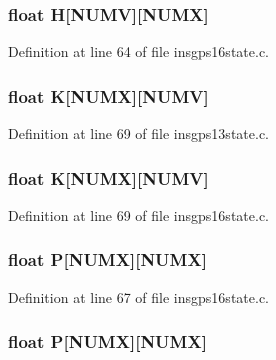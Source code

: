 \hypertarget{group___i_n_s_g_p_s_ga4080397a0d248e4c99d6f284b187f206}{
\subsubsection[{H}]{\setlength{\rightskip}{0pt plus 5cm}float H\mbox{[}N\-U\-M\-V\mbox{]}\mbox{[}N\-U\-M\-X\mbox{]}}}\label{group___i_n_s_g_p_s_ga4080397a0d248e4c99d6f284b187f206}


Definition at line 64 of file insgps16state.\-c.

\hypertarget{group___i_n_s_g_p_s_ga1a9a9b26f7cab8703fc488c6cc258490}{
\subsubsection[{K}]{\setlength{\rightskip}{0pt plus 5cm}float K\mbox{[}N\-U\-M\-X\mbox{]}\mbox{[}N\-U\-M\-V\mbox{]}}}\label{group___i_n_s_g_p_s_ga1a9a9b26f7cab8703fc488c6cc258490}


Definition at line 69 of file insgps13state.\-c.

\hypertarget{group___i_n_s_g_p_s_ga1a9a9b26f7cab8703fc488c6cc258490}{
\subsubsection[{K}]{\setlength{\rightskip}{0pt plus 5cm}float K\mbox{[}N\-U\-M\-X\mbox{]}\mbox{[}N\-U\-M\-V\mbox{]}}}\label{group___i_n_s_g_p_s_ga1a9a9b26f7cab8703fc488c6cc258490}


Definition at line 69 of file insgps16state.\-c.

\hypertarget{group___i_n_s_g_p_s_gaa4dd4832559078fffbbe0afa316c216c}{
\subsubsection[{P}]{\setlength{\rightskip}{0pt plus 5cm}float P\mbox{[}N\-U\-M\-X\mbox{]}\mbox{[}N\-U\-M\-X\mbox{]}}}\label{group___i_n_s_g_p_s_gaa4dd4832559078fffbbe0afa316c216c}


Definition at line 67 of file insgps16state.\-c.

\hypertarget{group___i_n_s_g_p_s_gaa4dd4832559078fffbbe0afa316c216c}{
\subsubsection[{P}]{\setlength{\rightskip}{0pt plus 5cm}float P\mbox{[}N\-U\-M\-X\mbox{]}\mbox{[}N\-U\-M\-X\mbox{]}}}\label{group___i_n_s_g_p_s_gaa4dd4832559078fffbbe0afa316c216c}


